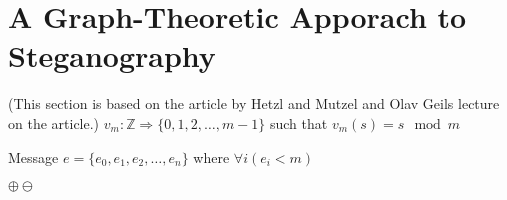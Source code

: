 \section{A Graph-Theoretic Apporach to Steganography}
\label{sec:graphtheory}
(This section is based on the article by Hetzl and Mutzel and Olav Geils lecture on the article.)
$ v_m: \mathds{Z} \Rightarrow \{0,1,2,\ldots,m-1\} $ such that $ v_m(s) = s \mod m $

Message $e = \{ e_0, e_1, e_2, \ldots, e_n \}$ where $\forall i\left( e_i < m \right)$



$\oplus \ominus$